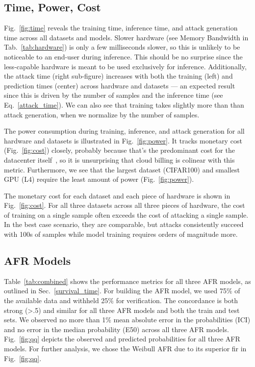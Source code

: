 \documentclass[conference]{IEEEtran}
\begin{document}
\subsection{Time, Power, Cost}
\label{res:cost}
Fig.~\ref{fig:time} reveals the training time, inference time, and attack generation time across all datasets and models. Slower hardware (see Memory Bandwidth in Tab.~\ref{tab:hardware}) is only a few milliseconds slower, so this is unlikely to be noticeable to an end-user during inference. This should be no surprise since the less-capable hardware is meant to be used exclusively for inference. Additionally, the attack time (right sub-figure) increases with both the training (left) and prediction times (center) across hardware and datasets --- an expected result since this is driven by the number of samples and the inference time (see Eq.~\ref{attack_time}). We can also see that training takes slightly more than than attack generation, when we normalize by the number of samples.

The power consumption during training, inference, and attack generation for all hardware and datasets is illustrated in Fig.~\ref{fig:power}. It tracks monetary cost (Fig.~\ref{fig:cost}) closely, probably because that's the predominant cost for the datacenter itself~\cite{dayarathna2015data}, so it is unsurprising that cloud billing is colinear with this metric. Furthermore, we see that the largest dataset (CIFAR100) and smallest GPU (L4) require the least amount of power (Fig.~\ref{fig:power}). 

The monetary cost for each dataset and each piece of hardware is shown in Fig.~\ref{fig:cost}. For all three datasets across all three pieces of hardware, the cost of training on a single sample often exceeds the cost of attacking a single sample. In the best case scenario, they are comparable, but attacks consistently succeed with 100s of samples while model training requires orders of magnitude more.

\subsection{AFR Models}
\label{res:afr}
Table~\ref{tab:combined} shows the performance metrics for all three AFR models, as outlined in Sec.~\ref{survival_time}. For building the AFR model, we used 75\% of the available data and withheld 25\% for verification. The concordance is both strong (>.5) and similar for all three AFR models and both the train and test sets. We observed no more than 1\% mean absolute error in the probabilities (ICI) and no error in the median probability (E50) across all three AFR models. Fig.~\ref{fig:qq} depicts the observed and predicted probabilities for all three AFR models. For further analysis, we chose the Weibull AFR due to its superior fir in  Fig.~\ref{fig:qq}.

\end{document}
